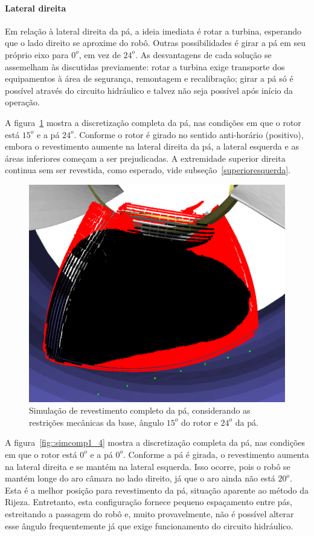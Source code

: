 \paragraph{Lateral direita}
Em relação à lateral direita da pá, a ideia imediata é rotar a turbina,
esperando que o lado direito se aproxime do robô. Outras possibilidades é
girar a pá em seu próprio eixo para $0^o$, em vez de $24^o$. As desvantagens de
cada solução se assemelham às discutidas previamente: rotar a turbina exige
transporte dos equipamentos à área de segurança, remontagem e recalibração;
girar a pá só é possível através do circuito hidráulico e talvez não seja
possível após início da operação.

A figura~\ref{fig::simcomp1_2} mostra a discretização completa da pá, nas
condições em que o rotor está $15^o$ e a pá $24^o$. Conforme o rotor é
girado no sentido anti-horário (positivo), embora o revestimento aumente na
lateral direita da pá, a lateral esquerda e as áreas inferiores começam a ser
prejudicadas. A extremidade superior direita continua sem ser revestida, como
esperado, vide subseção~\ref{superioresquerda}.

\begin{figure}[!ht]
	\centering	
	\includegraphics[width=.5\columnwidth]{figs/simcomp1_2.png}
	\caption{Simulação de revestimento completo da pá, considerando as
	restrições mecânicas da base, ângulo $15^o$ do rotor e $24^o$ da pá.}
	\label{fig::simcomp1_2}
\end{figure}

A figura~\ref{fig::simcomp1_4} mostra a discretização completa da pá, nas
condições em que o rotor está $0^o$ e a pá $0^o$. Conforme a pá é girada, o
revestimento aumenta na lateral direita e se mantém na lateral esquerda. Isso
ocorre, pois o robô se mantém longe do aro câmara no lado direito, já que o aro
ainda não está $20^o$. Esta é a melhor posição para revestimento da pá,
situação aparente ao método da Rijeza. Entretanto, esta configuração fornece
pequeno espaçamento entre pás, estreitando a passagem do robô e, muito
provavelmente, não é possível alterar esse ângulo frequentemente já que exige
funcionamento do circuito hidráulico.

